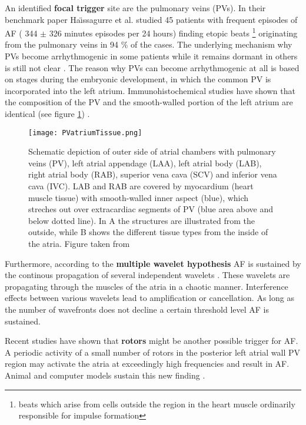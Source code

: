 \documentclass[type=dr, dr=rernat, accentcolor=tud7b,colorbacktitle, bigchapter, openright, twoside, 12pt ]{tudthesis}
\begin{document}
An identified \textbf{focal trigger} site are the pulmonary veins (PVs). In their benchmark paper Ha\"{\i}ssagurre et al. \cite{Hai98} studied 
45 patients with frequent episodes of AF ( 344 $\pm$ 326 minutes episodes per 24 hours) finding etopic beats \footnote{beats which arise 
from cells outside the region in the heart muscle ordinarily responsible for impulse formation} originating from the pulmonary veins in 
94 \% of the cases. The underlying mechanism why PVs become arrhythmogenic in some patients while it remains dormant in others is 
still not clear \cite{CE09}. The reason why PVs can become arrhythmogenic at all is based on stages during the embryonic development, in 
which the common PV is incorporated into the left atrium. Immunohistochemical studies have shown that the composition of the PV and the 
smooth-walled portion of the left atrium are identical (see figure \ref{walls}) \cite{CE09} \cite{Dou06}. 

\begin{figure}[H]
\begin{center}
\texttt{[image: PVatriumTissue.png]}
\caption{Schematic depiction of outer side of atrial chambers with pulmonary veins (PV), left atrial appendage (LAA), left atrial body (LAB), 
right atrial body (RAB), superior vena cava (SCV) and inferior vena cava (IVC). LAB and RAB are covered by myocardium (heart muscle tissue) 
with smooth-walled inner aspect (blue), which streches out over extracardiac segments of PV (blue area above and below dotted line). 
In A the structures are illustrated from the outside, while B shows the different tissue types from the inside of the atria. Figure 
taken from \cite{Dou06}}
\label{walls}
\end{center}
\end{figure}

Furthermore, according to the \textbf{multiple wavelet hypothesis} AF is sustained by the continous propagation of  several independent 
wavelets \cite{CE09}. These wavelets are propagating through the muscles of the atria in a chaotic manner. Interference effects between 
various wavelets lead to amplification or cancellation. As long as the number of wavefronts does not decline a certain threshold level AF 
is sustained.\newline

Recent studies have shown that \textbf{rotors} might be another possible trigger for AF. A periodic activity of a small number of rotors in 
the posterior left atrial wall PV region may activate the atria at exceedingly high frequencies and result in AF. Animal and computer 
models sustain this new finding \cite{Jal03}. \newline
\end{document}
